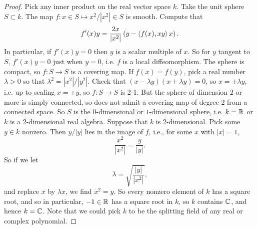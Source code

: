 \begin{proof}
Pick any inner product on the real vector space \(k\).
Take the unit sphere \(S \subset k\).
The map \(f \colon x \in S \mapsto x^2/|x^2| \in S\) is smooth.
Compute that
\[
f'(x)y=\frac{2x}{|x^2|}\left(y-\left<f(x),xy\right>x\right).
\]
In particular, if \(f'(x)y=0\) then \(y\) is a scalar multiple of \(x\).
So for \(y\) tangent to \(S\), \(f'(x)y=0\) just when \(y=0\), i.e. \(f\) is a local diffeomorphism.
The sphere is compact, so \(f \colon S \to S\) is a covering map.
If \(f(x)=f(y)\), pick a real number \(\lambda > 0\) so that \(\lambda^2=|x^2|/|y^2|\).
Check that \((x-\lambda y)(x+\lambda y)=0\), so \(x=\pm \lambda y\), i.e. up to scaling \(x=\pm y\), so \(f \colon S \to S\) is 2-1.
But the sphere of dimension \(2\) or more is simply connected, so does not admit a covering map of degree \(2\) from a connected space.
So \(S\) is the \(0\)-dimensional or \(1\)-dimensional sphere, i.e. \(k=\mathbb{R}^{}\) or \(k\) is a \(2\)-dimensional real algebra.
Suppose that \(k\) is \(2\)-dimensional.
Pick some \(y \in k\) nonzero.
Then \(y/|y|\) lies in the image of \(f\), i.e., for some \(x\) with \(|x|=1\), 
\[
\frac{x^2}{|x^2|}=\frac{y}{|y|}.
\]
So if we let
\[
\lambda = \sqrt{\frac{|y|}{|x^2|}},
\]
and replace \(x\) by \(\lambda x\), we find \(x^2=y\).
So every nonzero element of \(k\) has a square root, and so in particular, \(-1 \in \mathbb{R}^{}\) has a square root in \(k\), so \(k\) contains \(\mathbb{C}^{}\), and hence \(k=\mathbb{C}^{}\).
Note that we could pick \(k\) to be the splitting field of any real or complex polynomial.
\end{proof}

